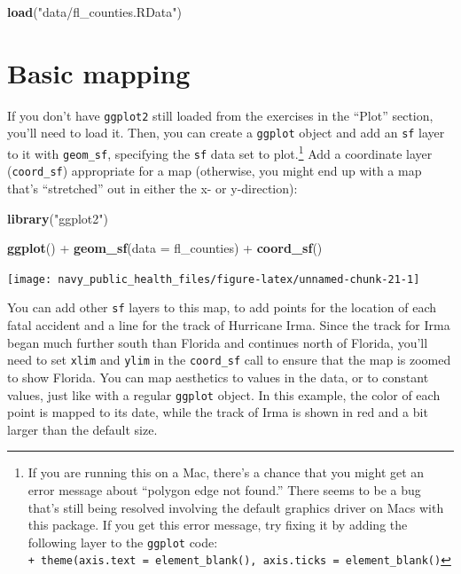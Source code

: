 \documentclass[]{tufte-book}
\newenvironment{Shaded}{}{}
\newcommand{\DataTypeTok}[1]{\textcolor[rgb]{0.56,0.13,0.00}{#1}}
\newcommand{\KeywordTok}[1]{\textcolor[rgb]{0.00,0.44,0.13}{\textbf{#1}}}
\newcommand{\NormalTok}[1]{#1}
\newcommand{\OperatorTok}[1]{\textcolor[rgb]{0.40,0.40,0.40}{#1}}
\newcommand{\StringTok}[1]{\textcolor[rgb]{0.25,0.44,0.63}{#1}}
\begin{document}
\begin{Shaded}
\begin{Highlighting}[]
\KeywordTok{load}\NormalTok{(}\StringTok{"data/fl_counties.RData"}\NormalTok{)}
\end{Highlighting}
\end{Shaded}

\hypertarget{basic-mapping}{%
\section{Basic mapping}\label{basic-mapping}}

If you don't have \texttt{ggplot2} still loaded from the exercises in the ``Plot'' section, you'll need to
load it. Then, you can create a \texttt{ggplot} object and add an \texttt{sf} layer to it with \texttt{geom\_sf}, specifying
the \texttt{sf} data set to plot.\footnote{If you are
  running this on a Mac, there's a chance that you might get an error message about ``polygon
  edge not found.'' There seems to be a bug that's still being resolved involving the default graphics
  driver on Macs with this package. If you get this error message, try fixing it by adding the
  following layer to the \texttt{ggplot} code: \texttt{+\ theme(axis.text\ =\ element\_blank(),\ axis.ticks\ =\ element\_blank()}}
Add a coordinate layer (\texttt{coord\_sf}) appropriate for a map (otherwise,
you might end up with a map that's ``stretched'' out in either the x- or y-direction):

\begin{Shaded}
\begin{Highlighting}[]
\KeywordTok{library}\NormalTok{(}\StringTok{"ggplot2"}\NormalTok{)}

\KeywordTok{ggplot}\NormalTok{() }\OperatorTok{+}\StringTok{ }\KeywordTok{geom_sf}\NormalTok{(}\DataTypeTok{data =}\NormalTok{ fl_counties) }\OperatorTok{+}\StringTok{ }\KeywordTok{coord_sf}\NormalTok{()}
\end{Highlighting}
\end{Shaded}

\texttt{[image: navy\_public\_health\_files/figure-latex/unnamed-chunk-21-1]}

You can add other \texttt{sf} layers to this map, to add points for the location of each fatal accident
and a line for the track of Hurricane Irma. Since the track for Irma began much further south than
Florida and continues north of Florida, you'll need to set \texttt{xlim} and \texttt{ylim} in the \texttt{coord\_sf} call
to ensure that the map is zoomed to show Florida. You can map aesthetics to values in the data, or
to constant values, just like with a regular \texttt{ggplot} object. In this example, the color of each
point is mapped to its date, while the track of Irma is shown in red and a bit larger than the
default size.
\end{document}
